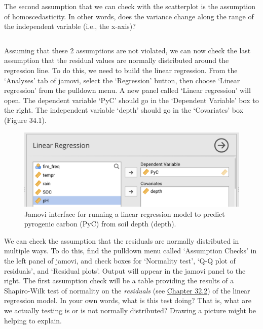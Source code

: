 \documentclass[
  openany]{krantz}
\begin{document}
The second assumption that we can check with the scatterplot is the assumption of homoscedasticity.
In other words, does the variance change along the range of the independent variable (i.e., the x-axis)?

\begin{verbatim}

\end{verbatim}

Assuming that these 2 assumptions are not violated, we can now check the last assumption that the residual values are normally distributed around the regression line.
To do this, we need to build the linear regression.
From the `Analyses' tab of jamovi, select the `Regression' button, then choose `Linear regression' from the pulldown menu.
A new panel called `Linear regression' will open.
The dependent variable `PyC' should go in the `Dependent Variable' box to the right.
The independent variable `depth' should go in the `Covariates' box (Figure 34.1).

\begin{figure}
\includegraphics[width=1\linewidth]{img/Jamovi_linear_regression} \caption{Jamovi interface for running a linear regression model to predict pyrogenic carbon (PyC) from soil depth (depth).}\label{fig:unnamed-chunk-153}
\end{figure}

We can check the assumption that the residuals are normally distributed in multiple ways.
To do this, find the pulldown menu called `Assumption Checks' in the left panel of jamovi, and check boxes for `Normality test', `Q-Q plot of residuals', and `Residual plots'.
Output will appear in the jamovi panel to the right.
The first assumption check will be a table providing the results of a Shapiro-Wilk test of normality on the \emph{residuals} (see \protect\hyperlink{intercepts-slopes-and-residuals}{Chapter 32.2}) of the linear regression model.
In your own words, what is this test doing?
That is, what are we actually testing is or is not normally distributed?
Drawing a picture might be helping to explain.
\end{document}
